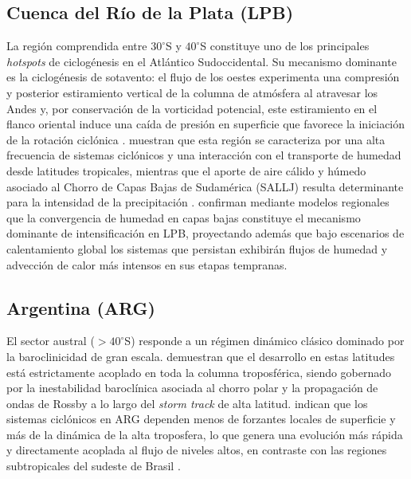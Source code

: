 \subsection{Cuenca del Río de la Plata (LPB)}\label{subsec:tb_lpb}

La región comprendida entre $30^\circ$S y $40^\circ$S constituye uno de los principales \textit{hotspots} de ciclogénesis en el Atlántico Sudoccidental. Su mecanismo dominante es la ciclogénesis de sotavento: el flujo de los oestes experimenta una compresión y posterior estiramiento vertical de la columna de atmósfera al atravesar los Andes y, por conservación de la vorticidad potencial, este estiramiento en el flanco oriental induce una caída de presión en superficie que favorece la iniciación de la rotación ciclónica \citep{gan1994influence}. \citet{reboita2010south} muestran que esta región se caracteriza por una alta frecuencia de sistemas ciclónicos y una interacción con el transporte de humedad desde latitudes tropicales, mientras que el aporte de aire cálido y húmedo asociado al Chorro de Capas Bajas de Sudamérica (SALLJ) resulta determinante para la intensidad de la precipitación \citep{crespo2020potential}. \citet{gramcianinov2024early} confirman mediante modelos regionales que la convergencia de humedad en capas bajas constituye el mecanismo dominante de intensificación en LPB, proyectando además que bajo escenarios de calentamiento global los sistemas que persistan exhibirán flujos de humedad y advección de calor más intensos en sus etapas tempranas.

\subsection{Argentina (ARG)}\label{subsec:tb_arg}

El sector austral ($>40^\circ$S) responde a un régimen dinámico clásico dominado por la baroclinicidad de gran escala. \citet{hoskins2005new} demuestran que el desarrollo en estas latitudes está estrictamente acoplado en toda la columna troposférica, siendo gobernado por la inestabilidad baroclínica asociada al chorro polar y la propagación de ondas de Rossby a lo largo del \textit{storm track} de alta latitud. \citet{simmonds2000variability} indican que los sistemas ciclónicos en ARG dependen menos de forzantes locales de superficie y más de la dinámica de la alta troposfera, lo que genera una evolución más rápida y directamente acoplada al flujo de niveles altos, en contraste con las regiones subtropicales del sudeste de Brasil \citep{vera2002cold}.

